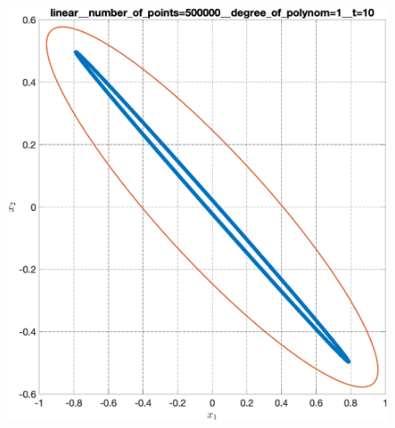 \documentclass[../main.tex]{subfiles}
\begin{document}
\begin{figure}[ht!]
\begin{minipage}[b]{.3\linewidth}
  	\end{minipage} 
  	\vfill
  	\begin{minipage}[b]{.3\linewidth} 
  		\small
  		\centering 
  		\includegraphics[width=\linewidth]{images/linear__number_of_points=500000__degree_of_polynom=1__t=10.eps}
  		\label{fig:ap:linearN5105k1T10}
  	\end{minipage}
  	\hfill
  	\begin{minipage}[b]{.3\linewidth} 
  		\small
  		\centering

\end{minipage}
\end{figure}
\end{document}
